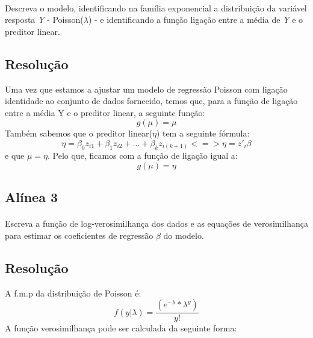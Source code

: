 \documentclass{article}
\begin{document}
			\paragraph{}
				Descreva o modelo, identificando na família exponencial a distribuição da variável resposta \textit{Y} - Poisson($\lambda$) - e identificando a função ligação entre a média de \textit{Y} e o preditor linear.

			\subsection*{Resolução}
				Uma vez que estamos a ajustar um modelo de regressão Poisson com ligação identidade ao conjunto de dados fornecido, temos que, para a função de ligação entre a média Y e o preditor linear, a seguinte função:
				\begin{equation*}	
				 	g(\mu) = \mu
				\end{equation*}
				Também sabemos que o preditor linear($\eta$) tem a seguinte fórmula:
				\begin{equation*}	
				 	\eta = \beta_{0}z_{i1} +  \beta_{1}z_{i2} + ... +  \beta_{k}z_{i(k+1)} <=> \eta = z'_{i}\beta
				\end{equation*}
				 e que $\mu = \eta$. Pelo que, ficamos com a função de ligação igual a:
				\begin{equation*}	
				 	g(\mu) = \eta
				\end{equation*}


		\subsection*{Alínea 3}
			\paragraph{}
				Escreva a função de log-verosimilhança dos dados e as equações de verosimilhança para estimar os coeficientes de regressão $\beta$ do modelo.

			\subsection*{Resolução}
				A f.m.p da distribuição de Poisson é: 
				\begin{equation*}
					f(y| \lambda)=\frac{ (e^{-\lambda}*\lambda^{y})}{y!}
				\end{equation*}
				A função verosimilhança pode ser calculada da seguinte forma: \paragraph{}
				
\end{document}
